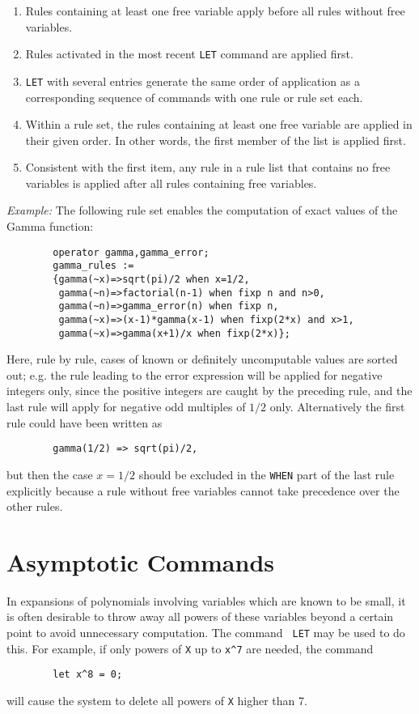 \begin{enumerate}
\item Rules containing at least one free variable apply before all rules
without free variables.
\item Rules activated in the most recent {\tt LET}
command are applied first.
\item {\tt LET} with several entries generate
the same order of application as a corresponding sequence of commands with
one rule or rule set each.
\item Within a rule set, the rules containing at least
one free variable are applied in their given order.
In other words, the first member of the list is applied first.
\item Consistent with the first item, any rule in a rule list that
contains no free variables is applied after all rules containing free
variables.
\end{enumerate}
{\it Example:} The following rule set enables the computation of exact
values of the Gamma function:
\begin{verbatim}
        operator gamma,gamma_error;
        gamma_rules :=
        {gamma(~x)=>sqrt(pi)/2 when x=1/2,
         gamma(~n)=>factorial(n-1) when fixp n and n>0,
         gamma(~n)=>gamma_error(n) when fixp n,
         gamma(~x)=>(x-1)*gamma(x-1) when fixp(2*x) and x>1,
         gamma(~x)=>gamma(x+1)/x when fixp(2*x)};
\end{verbatim}
Here, rule by rule, cases of known or definitely uncomputable values
are sorted out; e.g. the rule leading to the error expression
will be applied for negative integers only, since the positive
integers are caught by the preceding rule, and the
last rule will apply for negative odd multiples of $1/2$ only.
Alternatively the first rule could have been written as
\begin{verbatim}
        gamma(1/2) => sqrt(pi)/2,
\end{verbatim}
but then the case $x=1/2$ should be excluded in the {\tt WHEN} part of the
last rule explicitly because a rule without free variables cannot take
precedence over the other rules.

\section{Asymptotic Commands} 
In expansions of polynomials involving variables which are known to be
small, it is often desirable to throw away all powers of these variables
beyond a certain point to avoid unnecessary computation.  The command {\tt
LET} may be used to do this.  For example, if only powers of {\tt X} up to
{\tt x\^{ }7} are needed, the command
\begin{verbatim}
        let x^8 = 0;
\end{verbatim}
will cause the system to delete all powers of {\tt X} higher than 7.

